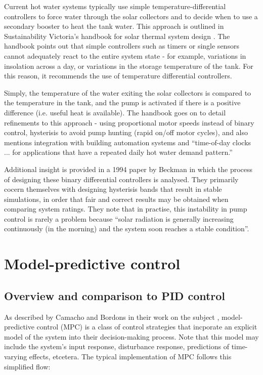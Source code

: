 Current hot water systems typically use simple temperature-differential controllers to force water through the solar collectors and to decide when to use a secondary booster to heat the tank water.
This approach is outlined in Sustainability Victoria's handbook for solar thermal system design \cite{LSTS}.
The handbook points out that simple controllers such as timers or single sensors cannot adequately react to the entire system state - for example, variations in insolation across a day, or variations in the storage temperature of the tank.
For this reason, it recommends the use of temperature differential controllers.

Simply, the temperature of the water exiting the solar collectors is compared to the temperature in the tank, and the pump is activated if there is a positive difference (i.e. useful heat is available).
The handbook goes on to detail refinements to this approach - using proportional motor speeds instead of binary control, hysterisis to avoid pump hunting (rapid on/off motor cycles), and also mentions integration with building automation systems and ``time-of-day clocks ... for applications that have a repeated daily hot water demand pattern.''

Additional insight is provided in a 1994 paper by Beckman \etal \cite{Beckman94} in which the process of designing these binary differential controllers is analysed.
They primarily cocern themselves with designing hysterisis bands that result in stable simulations, in order that fair and correct results may be obtained when comparing system ratings.
They note that in practise, this instability in pump control is rarely a problem because ``solar radiation is generally increasing continuously (in the morning) and the system soon reaches a stable condition''.

\section{Model-predictive control}

\subsection{Overview and comparison to PID control}

As described by Camacho and Bordons in their work on the subject \cite{Camacho04}, model-predictive control (MPC) is a class of control strategies that incporate an explicit model of the system into their decision-making process.
Note that this model may include the system's input response, disturbance response, predictions of time-varying effects, etcetera.
The typical implementation of MPC follows this simplified flow:

